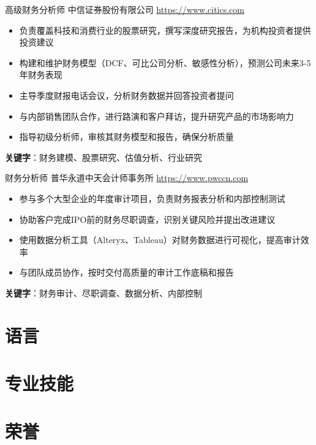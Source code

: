 \documentclass[a4paper, serif, 10pt]{moderncv}
\begin{document}
        {高级财务分析师}
        {中信证券股份有限公司}
        {\url{https://www.citics.com}}
        {}
        {\begin{itemize}
\item 负责覆盖科技和消费行业的股票研究，撰写深度研究报告，为机构投资者提供投资建议
\item 构建和维护财务模型（DCF、可比公司分析、敏感性分析），预测公司未来3-5年财务表现
\item 主导季度财报电话会议，分析财务数据并回答投资者提问
\item 与内部销售团队合作，进行路演和客户拜访，提升研究产品的市场影响力
\item 指导初级分析师，审核其财务模型和报告，确保分析质量
\end{itemize}
\textbf{关键字}：财务建模、股票研究、估值分析、行业研究}

        {财务分析师}
        {普华永道中天会计师事务所}
        {\url{https://www.pwccn.com}}
        {}
        {\begin{itemize}
\item 参与多个大型企业的年度审计项目，负责财务报表分析和内部控制测试
\item 协助客户完成IPO前的财务尽职调查，识别关键风险并提出改进建议
\item 使用数据分析工具（Alteryx、Tableau）对财务数据进行可视化，提高审计效率
\item 与团队成员协作，按时交付高质量的审计工作底稿和报告
\end{itemize}
\textbf{关键字}：财务审计、尽职调查、数据分析、内部控制}
\section{语言}

\section{专业技能}

\section{荣誉}
\end{document}
